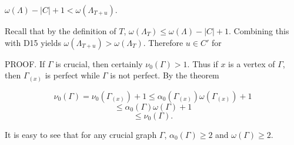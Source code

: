$\omega(\Lambda) - |C| + 1 < \omega(\Lambda_{T+{u}})$.

Recall that by the definition of $T$, $\omega(\Lambda_T) \leq \omega(\Lambda) - |C| + 1$. Combining this with D15 yields $\omega(\Lambda_{T+{u}}) > \omega(\Lambda_T)$. Therefore $u \in C'$ for

PROOF. If $\Gamma$ is crucial, then certainly $\nu_0(\Gamma) > 1$. Thus if $x$ is a vertex of $\Gamma$, then $\Gamma_{(x)}$ is perfect while $\Gamma$ is not perfect. By the theorem

$$\nu_0(\Gamma) = \nu_0(\Gamma_{(x)}) + 1 \leq \alpha_0(\Gamma_{(x)})\omega(\Gamma_{(x)}) + 1$$
$$\leq \alpha_0(\Gamma)\omega(\Gamma) + 1$$
$$\leq \nu_0(\Gamma).$$

It is easy to see that for any crucial graph $\Gamma$, $\alpha_0(\Gamma) \geq 2$ and $\omega(\Gamma) \geq 2$.
